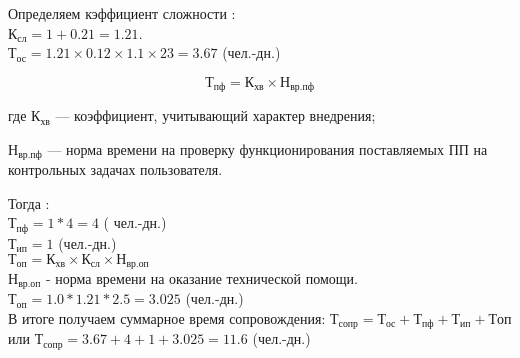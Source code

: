 \begin{par}
Определяем кэффициент сложности : \\
$\textrm{К}_\textrm{сл} = 1 + 0.21 = 1.21$. \\
$\textrm{Т}_\textrm{ос} =  1.21 \times{} 0.12 \times{} 1.1 \times{} 23 = 3.67$ (чел.-дн.) 
\end{par}

\begin{equation}
	\textrm{Т}_\textrm{пф} = \textrm{К}_\textrm{хв} \times{} \textrm{Н}_\textrm{вр.пф}
\end{equation}
\begin{ESKDexplanation}
	\item[где ] $\textrm{К}_\textrm{хв}$ --- коэффициент, учитывающий характер внедрения;
	\item{} $\textrm{Н}_\textrm{вр.пф}$ --- норма времени на проверку функционирования поставляемых ПП на контрольных задачах пользователя.
\end{ESKDexplanation}
Тогда : \\
$\textrm{Т}_\textrm{пф} = 1 * 4 = 4$ ( чел.-дн.) \\
$\textrm{Т}_\textrm{ип} = 1$ (чел.-дн.) \\
$\textrm{Т}_\textrm{оп} = \textrm{К}_\textrm{хв} \times{} \textrm{К}_\textrm{сл} \times{} \textrm{Н}_\textrm{вр.оп}$ \\
$\textrm{Н}_\textrm{вр.оп}$ - норма времени на оказание технической помощи. \\
$\textrm{Т}_\textrm{оп} = 1.0 * 1.21 * 2.5 = 3.025$ (чел.-дн.) \\
В итоге получаем суммарное время сопровождения:
$\textrm{Т}_\textrm{сопр} = \textrm{Т}_\textrm{ос} + \textrm{Т}_\textrm{пф} +\textrm{Т}_\textrm{ип} + \textrm{Т}\textrm{оп}$    или
$\textrm{Т}_\textrm{сопр} = 3.67 + 4 + 1 + 3.025 = 11.6$ (чел.-дн.)


